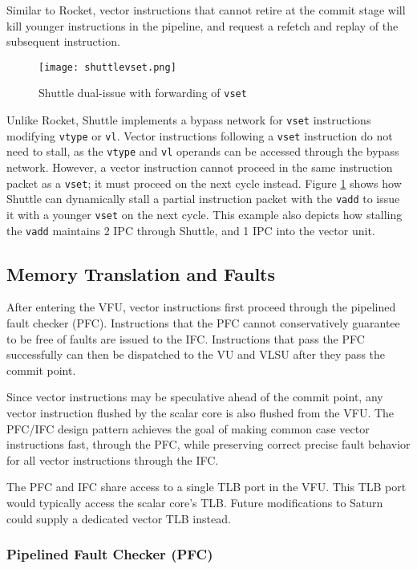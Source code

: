 Similar to Rocket, vector instructions that cannot retire at the commit stage will kill younger instructions in the pipeline, and request a refetch and replay of the subsequent instruction.

\begin{figure}[h]
  \centering
  \texttt{[image: shuttlevset.png]}
  \caption{Shuttle dual-issue with forwarding of \texttt{vset}}
  \label{fig:shuttle-vset}
\end{figure}

Unlike Rocket, Shuttle implements a bypass network for \texttt{vset} instructions modifying \texttt{vtype} or \texttt{vl}.
Vector instructions following a \texttt{vset} instruction do not need to stall, as the \texttt{vtype} and \texttt{vl} operands can be accessed through the bypass network.
However, a vector instruction cannot proceed in the same instruction packet as a \texttt{vset}; it must proceed on the next cycle instead.
Figure \ref{fig:shuttle-vset} shows how Shuttle can dynamically stall a partial instruction packet with the \texttt{vadd} to issue it with a younger \texttt{vset} on the next cycle.
This example also depicts how stalling the \texttt{vadd} maintains 2 IPC through Shuttle, and 1 IPC into the vector unit.

\subsection{Memory Translation and Faults}

After entering the VFU, vector instructions first proceed through the pipelined fault checker (PFC).
Instructions that the PFC cannot conservatively guarantee to be free of faults are issued to the IFC.
Instructions that pass the PFC successfully can then be dispatched to the VU and VLSU after they pass the commit point.

Since vector instructions may be speculative ahead of the commit point, any vector instruction flushed by the scalar core is also flushed from the VFU.
The PFC/IFC design pattern achieves the goal of making common case vector instructions fast, through the PFC, while preserving correct precise fault behavior for all vector instructions through the IFC.

The PFC and IFC share access to a single TLB port in the VFU.
This TLB port would typically access the scalar core's TLB.
Future modifications to Saturn could supply a dedicated vector TLB instead.


\subsubsection{Pipelined Fault Checker (PFC)}

